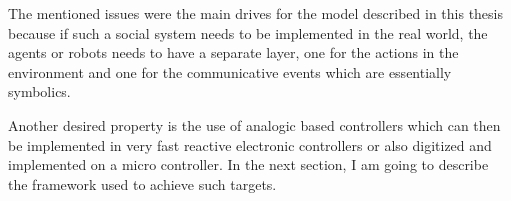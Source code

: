 The mentioned issues were the main drives for the model described in this thesis because 
if such a social system needs to be implemented in the real world, the agents 
or robots needs to have a separate layer, one for the actions in the environment and one
 for the communicative events which are essentially symbolics.

Another desired property is the use of analogic based controllers which can 
then be implemented in very fast reactive electronic controllers or also 
digitized and implemented on a micro controller.
In the next section, I am going to describe the framework used to achieve such targets.



